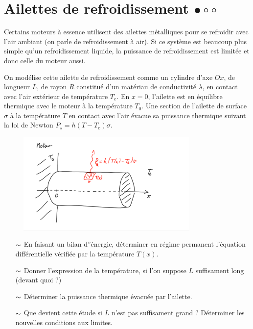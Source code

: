 \documentclass{report}
\begin{document}
\newpage

\section*{Ailettes de refroidissement $\bullet\circ\circ$}

Certains moteurs à essence utilisent des ailettes métalliques pour se refroidir avec l'air ambiant (on parle de refroidissement à air). Si ce système est beaucoup plus simple qu'un refroidissement liquide, la puissance de refroidissement est limitée et donc celle du moteur aussi.

On modélise cette ailette de refroidissement comme un cylindre d'axe $Ox$, de longueur $L$, de rayon $R$ constitué d'un matériau de conductivité $\lambda$, en contact avec l'air extérieur de température $T_e$. En $x=0$, l'ailette est en équilibre thermique avec le moteur à la température $T_0$. Une section de l'ailette de surface $\sigma$ à la température $T$ en contact avec l'air évacue sa puissance thermique suivant la loi de Newton $P_s=h(T-T_e)\sigma$.

\begin{figure}[h!]
\centering
  \includegraphics[width=0.8\textwidth]{ailette.pdf}
\end{figure}

\begin{itemize}

	\item[$\thicksim$] En faisant un bilan d''énergie, déterminer en régime permanent l'équation différentielle vérifiée par la température $T(x)$.
	
	\item[$\thicksim$] Donner l'expression de la température, si l'on suppose $L$ suffisament long (devant quoi ?)
	
	\item[$\thicksim$] Déterminer la puissance thermique évacuée par l'ailette.
	
	\item[$\thicksim$] Que devient cette étude si $L$ n'est pas suffisament grand ? Déterminer les nouvelles conditions aux limites.

\end{itemize}
\end{document}
